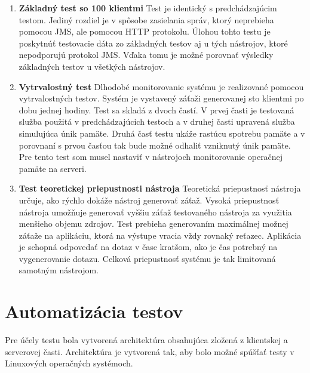 \documentclass[12pt,oneside,final]{fithesis-utf8}
\begin{document}
\begin{enumerate}
\item \textbf{Základný test so 100 klientmi}
\newline
Test je identický s predchádzajúcim testom. Jediný rozdiel je v spôsobe zasielania správ, ktorý neprebieha pomocou JMS, ale pomocou HTTP protokolu. Úlohou tohto testu je poskytnúť testovacie dáta zo základných testov aj u tých nástrojov, ktoré nepodporujú protokol JMS. Vďaka tomu je možné porovnať výsledky základných testov u všetkých nástrojov.
\newline

\item \textbf{Vytrvalostný test}
\newline
Dlhodobé monitorovanie systému je realizované pomocou vytrvalostných testov. Systém je vystavený záťaži generovanej sto klientmi po dobu jednej hodiny. Test sa skladá z dvoch častí. V prvej časti je testovaná služba použitá v predchádzajúcich testoch a v druhej časti upravená služba simulujúca únik pamäte. Druhá časť testu ukáže rastúcu spotrebu pamäte a v porovnaní s prvou časťou tak bude možné odhaliť vzniknutý únik pamäte. Pre tento test som musel nastaviť v nástrojoch monitorovanie operačnej pamäte na serveri.
\newline

\item \textbf{Test teoretickej priepustnosti nástroja}
\newline
Teoretická priepustnosť nástroja určuje, ako rýchlo dokáže nástroj generovať záťaž. Vysoká priepustnosť nástroja umožňuje generovať vyššiu záťaž testovaného nástroja za využitia menšieho objemu zdrojov. Test prebieha generovaním maximálnej možnej záťaže na aplikáciu, ktorá na výstupe vracia vždy rovnaký reťazec. Aplikácia je schopná odpovedať na dotaz v čase kratšom, ako je čas potrebný na vygenerovanie dotazu. Celková priepustnosť systému je tak limitovaná samotným nástrojom.

\end{enumerate}

\newpage
\section{Automatizácia testov}
Pre účely testu bola vytvorená architektúra obsahujúca zložená z klientskej a serverovej časti. Architektúra je vytvorená tak, aby bolo možné spúšťať testy v Linuxových operačných systémoch.
\end{document}
